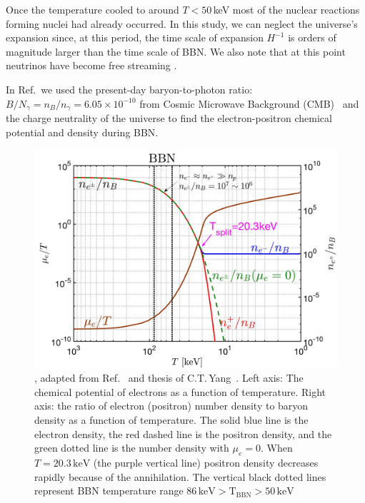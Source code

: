 Once the temperature cooled to around $T<50\,$keV most of the nuclear reactions forming nuclei had already occurred. In this study, we can neglect the universe's expansion since, at this period, the time scale of expansion $H^{-1}$ is orders of magnitude larger than the time scale of BBN. We also note that at this point neutrinos have become free streaming \cite{Birrell:2012gg}.

In Ref.\,\cite{Grayson:2022asf} we used the present-day baryon-to-photon ratio: $B/N_\gamma =n_B/n_\gamma= 6.05\times10^{-10}$ from Cosmic Microwave Background (CMB)~\cite{ParticleDataGroup:2022pth} and the charge neutrality of the universe to find the electron-positron chemical potential and density during BBN.
\begin{figure}  
\centerline{\includegraphics[width=0.90\linewidth]{plots/chap03BBN/May152023_EPDensity_Chemical}}
\caption{, adapted from Ref.~\cite{Grayson:2023flr} and thesis of C.T.\,Yang~\cite{Yang:2024ret}. Left axis: The chemical potential of electrons as a function of temperature. Right axis: the ratio of electron (positron) number density to baryon density as a function of temperature. The solid blue line is the electron density, the red dashed line is the positron density, and the green dotted line is the number density with $\mu_e=0$. When $T=20.3\,\mathrm{keV}$ (the purple vertical line) positron density decreases rapidly because of the annihilation. The vertical black dotted lines represent BBN temperature range $86\,\mathrm{keV}>\mathrm{T_{BBN}}>50\,\mathrm{keV}$}
\label{BBN_Electron} 
\end{figure}

